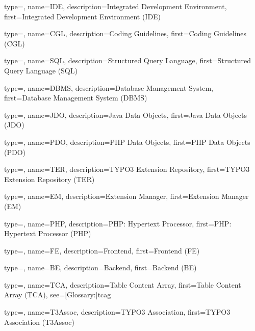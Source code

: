 
{
	type=\acronymtype,
	name={IDE},
	description={Integrated Development Environment},
	first={Integrated Development Environment (IDE)}
}

{
	type=\acronymtype,
	name={CGL},
	description={Coding Guidelines},
	first={Coding Guidelines (CGL)}
}

{
	type=\acronymtype,
	name={SQL},
	description={Structured Query Language},
	first={Structured Query Language (SQL)}
}

{
	type=\acronymtype,
	name={DBMS},
	description={Database Management System},
	first={Database Management System (DBMS)}
}

{
	type=\acronymtype,
	name={JDO},
	description={Java Data Objects},
	first={Java Data Objects (JDO)}
}

{
	type=\acronymtype,
	name={PDO},
	description={PHP Data Objects},
	first={PHP Data Objects (PDO)}
}

{
	type=\acronymtype,
	name={TER},
	description={TYPO3 Extension Repository},
	first={TYPO3 Extension Repository (TER)}
}

{
	type=\acronymtype,
	name={EM},
	description={Extension Manager},
	first={Extension Manager (EM)}
}

{
	type=\acronymtype,
	name={PHP},
	description={PHP: Hypertext Processor},
	first={PHP: Hypertext Processor (PHP)}
}

{
	type=\acronymtype,
	name={FE},
	description={Frontend},
	first={Frontend (FE)}
}

{
	type=\acronymtype,
	name={BE},
	description={Backend},
	first={Backend (BE)}
}

{
	type=\acronymtype,
	name={TCA},
	description={Table Content Array},
	first={Table Content Array (TCA)},
	see=[Glossary:]{tcag}
}

{
	type=\acronymtype,
	name={T3Assoc},
	description={TYPO3 Association},
	first={TYPO3 Association (T3Assoc)}
}


